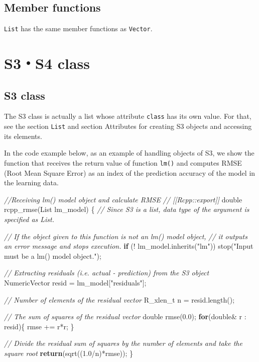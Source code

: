 \documentclass[
]{book}
\newenvironment{Shaded}{\begin{snugshade}}{\end{snugshade}}
\newcommand{\CommentTok}[1]{\textcolor[rgb]{0.56,0.35,0.01}{\textit{#1}}}
\newcommand{\ControlFlowTok}[1]{\textcolor[rgb]{0.13,0.29,0.53}{\textbf{#1}}}
\newcommand{\DataTypeTok}[1]{\textcolor[rgb]{0.13,0.29,0.53}{#1}}
\newcommand{\FloatTok}[1]{\textcolor[rgb]{0.00,0.00,0.81}{#1}}
\newcommand{\NormalTok}[1]{#1}
\newcommand{\StringTok}[1]{\textcolor[rgb]{0.31,0.60,0.02}{#1}}
\begin{document}
\hypertarget{member-functions}{%
\section{Member functions}\label{member-functions}}

\texttt{List} has the same member functions as \texttt{Vector}.

\hypertarget{s3s4-class}{%
\chapter{S3・S4 class}\label{s3s4-class}}

\hypertarget{s3-class}{%
\section{S3 class}\label{s3-class}}

The S3 class is actually a list whose attribute \texttt{class} has its own value. For that, see the section \texttt{List} and section Attributes for creating S3 objects and accessing its elements.

In the code example below, as an example of handling objects of S3, we show the function that receives the return value of function \texttt{lm()} and computes RMSE (Root Mean Square Error) as an index of the prediction accuracy of the model in the learning data.

\begin{Shaded}
\begin{Highlighting}[]
\CommentTok{//Receiving lm() model object and calculate RMSE}
\CommentTok{// [[Rcpp::export]]}
\DataTypeTok{double}\NormalTok{ rcpp_rmse(List lm_model) \{}
    \CommentTok{// Since S3 is a list, data type of the argument is specified as List.}

    \CommentTok{// If the object given to this function is not an lm() model object,}
    \CommentTok{// it outputs an error message and stops execution.}
    \ControlFlowTok{if}\NormalTok{ (! lm_model.inherits(}\StringTok{"lm"}\NormalTok{)) stop(}\StringTok{"Input must be a lm() model object."}\NormalTok{);}

    \CommentTok{// Extracting residuals (i.e. actual - prediction) from the S3 object}
\NormalTok{    NumericVector resid  = lm_model[}\StringTok{"residuals"}\NormalTok{];}

    \CommentTok{// Number of elements of the residual vector}
    \DataTypeTok{R_xlen_t}\NormalTok{ n = resid.length();}

    \CommentTok{// The sum of squares of the residual vector}
    \DataTypeTok{double}\NormalTok{ rmse(}\FloatTok{0.0}\NormalTok{);}
    \ControlFlowTok{for}\NormalTok{(}\DataTypeTok{double}\NormalTok{& r : resid)\{}
\NormalTok{        rmse += r*r;}
\NormalTok{    \}}

    \CommentTok{// Divide the residual sum of squares by the number of elements and take the square root}
    \ControlFlowTok{return}\NormalTok{(sqrt((}\FloatTok{1.0}\NormalTok{/n)*rmse));}
\NormalTok{\}}
\end{Highlighting}
\end{Shaded}
\end{document}
